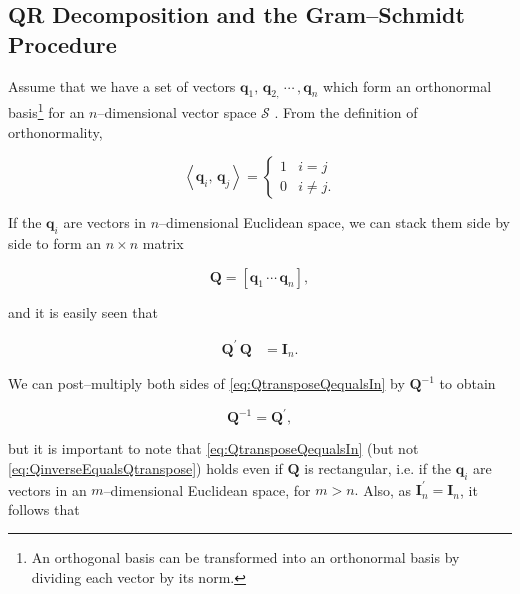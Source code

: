 \documentclass[graybox,envcountchap,sectrefs]{svmono}\usepackage[]{graphicx}\usepackage[]{xcolor}
\begin{document}
\begin{appendices}
\subsection{QR Decomposition and the Gram--Schmidt Procedure\label{subsec:QR_Decomposition}}

Assume that we have a set of vectors $\mathrm{\mathbf{q}}_{1},\,\mathrm{\mathbf{q}}_{2,}\,\cdots\,,\mathrm{\mathbf{q}}_{n}$
which form an orthonormal basis\footnote{An orthogonal basis can be transformed into an orthonormal basis by
dividing each vector by its norm.} for an $n$--dimensional vector space $\mathcal{{S}}$ . From the
definition of orthonormality,

\begin{equation}
\left\langle \mathrm{\mathbf{q}}_{i},\,\mathrm{\mathbf{q}}_{j}\right\rangle =\begin{cases}
1 & i=j\\
0 & i\ne j.
\end{cases}\label{eq:Orthonormality}
\end{equation}

If the $\mathrm{\mathbf{q}}_{i}$ are vectors in $n$--dimensional
Euclidean space, we can stack them side by side to form an $n\times n$
matrix

\begin{equation}
\mathrm{\mathbf{Q}}=\left[\mathrm{\mathbf{q}}_{1}\,\cdots\,\mathrm{\mathbf{q}}_{n}\right],\label{eq:Qmatrix}
\end{equation}

and it is easily seen that 

\begin{align}
\mathrm{\mathbf{Q}}^{\prime}\,\mathrm{\mathbf{Q}} & =\mathrm{\mathbf{I}}_{n}.\label{eq:QtransposeQequalsIn}
\end{align}

We can post--multiply both sides of \eqref{eq:QtransposeQequalsIn}
by $\mathrm{\mathbf{Q}}^{-1}$ to obtain

\begin{equation}
\mathrm{\mathbf{Q}}^{-1}=\mathrm{\mathbf{Q}}^{\prime},\label{eq:QinverseEqualsQtranspose}
\end{equation}

but it is important to note that \eqref{eq:QtransposeQequalsIn} (but
not \eqref{eq:QinverseEqualsQtranspose}) holds even if $\mathrm{\mathbf{Q}}$
is rectangular, i.e. if the $\mathrm{\mathbf{q}}_{i}$ are vectors
in an $m$--dimensional Euclidean space, for $m>n.$ Also, as $\mathrm{\mathbf{I}}_{n}^{\prime}=\mathrm{\mathbf{I}}_{n}$,
it follows that


\end{appendices}
\end{document}
